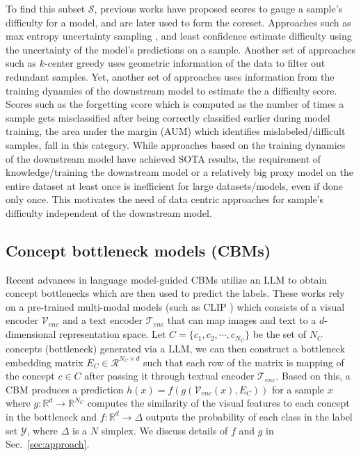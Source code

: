 To find this subset $\mathcal{S}$, previous works have proposed scores to gauge a sample's difficulty for a model, and are later used to form the coreset. 
Approaches such as max entropy uncertainty sampling \cite{lewis1994heterogeneous, Settles_2012}, and least confidence \cite{culotta2005reducing} estimate difficulty using the uncertainty of the model's predictions on a sample. %
Another set of approaches such as $k$-center greedy \cite{sener2017active} uses  geometric information of the data to filter out redundant samples. 
Yet, another set of approaches uses information from the training dynamics of the downstream model to estimate the a difficulty score. 
Scores such as the forgetting score \cite{toneva2018empirical} which is computed as the number of times a sample gets misclassified after being correctly classified earlier during model training, the area under the margin (AUM) \cite{pleiss2020identifying} which identifies mislabeled/difficult samples, fall in this category.
While approaches based on the training dynamics of the downstream model have achieved SOTA results, the requirement of knowledge/training the downstream model or a relatively big proxy model on the entire dataset at least once is inefficient for large datasets/models, even if done only once. 
This motivates the need of data centric approaches for sample's difficulty independent of the downstream model.

\subsection{Concept bottleneck models (CBMs)}
\label{sec:preliminaries_cbm}
Recent advances in language model-guided CBMs utilize an LLM to obtain concept bottlenecks which are then used to predict the labels. 
These works rely on a pre-trained multi-modal models (such as CLIP \cite{radford2021learning}) which consists of a visual encoder $\mathcal{V}_{enc}$ and a text encoder $\mathcal{T}_{enc}$ that can map images and text to a $d$-dimensional representation space. %
Let $C = \{c_1, c_2, \cdots, c_{N_C}\}$ be the set of $N_C$ concepts (bottleneck) generated via a LLM, we can then construct a bottleneck embedding matrix $E_C \in \mathcal{R}^{N_C \times d}$ such that each row of the matrix is mapping of the concept $c \in C$ after passing it through textual encoder $\mathcal{T}_{enc}$.
Based on this, a CBM  \cite{yang2023language} produces a prediction $h(x) = f(g(\mathcal{V}_{enc}(x), E_C))$ for a sample $x$ where $g:\mathbb{R}^{d} \rightarrow \mathbb{R}^{N_C}$ computes the similarity of the visual features to each concept in the bottleneck and $f:\mathbb{R}^{d} \rightarrow \Delta$ outputs the probability of each class in the label set $\mathcal{Y}$, where $\Delta$ is a $N$ simplex.
We discuss details of $f$ and $g$ in Sec.~\ref{sec:approach}.